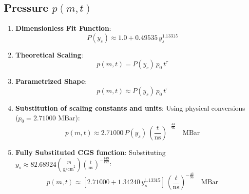 \documentclass[11pt]{article}
\begin{document}
\subsection{Pressure $p(m,t)$}
\begin{enumerate}
    \item \textbf{Dimensionless Fit Function}:
    $$P(y_s) \approx 1.0 + 0.49535 \, y_s^{1.13315}$$
    
    \item \textbf{Theoretical Scaling}:
    $$p(m,t) = P(y_s) \, p_0 \, t^\tau$$
    
    \item \textbf{Parametrized Shape}:
    $$p(m,t) \approx P(y_s) \, p_0 \, t^\tau$$
    
    \item \textbf{Substitution of scaling constants and units}:
    Using physical conversions ($p_0 = 2.71000 \text{ MBar}$):
    $$p(m,t) \approx 2.71000 \, P(y_s) \, \left(\frac{t}{\text{ns}}\right)^{-\frac{43}{96}} \quad \text{MBar}$$
    
    \item \textbf{Fully Substituted CGS function}:
    Substituting $y_s \approx 82.68924 \left(\frac{m}{\text{g/cm}^2}\right) \left(\frac{t}{\text{ns}}\right)^{-\frac{149}{192}}$:
    $$p(m,t) \approx \left[ 2.71000 + 1.34240 \, y_s^{1.13315} \right] \, \left(\frac{t}{\text{ns}}\right)^{-\frac{43}{96}} \quad \text{MBar}$$
\end{enumerate}
\end{document}
